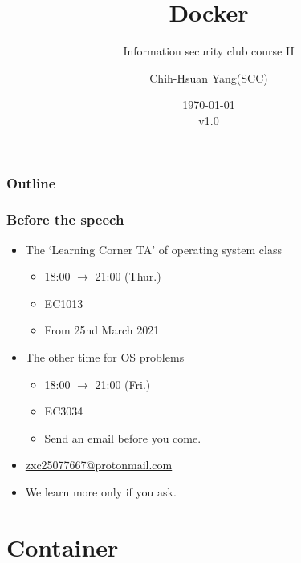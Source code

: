 \documentclass{beamer}
\title{Docker}
\subtitle{Information security club course \RN{2}}
\author{Chih-Hsuan Yang(SCC)}
\institute{National Sun Yat-sen University}
\date{\today\\v1.0}
\begin{document}
\begin{frame}
    \titlepage
\end{frame}

\begin{frame}
    \frametitle{Outline}
    \begin{multicols}{2}
        \tableofcontents
    \end{multicols}
\end{frame}

\begin{frame}
    \frametitle{Before the speech}
    \begin{itemize}
        \item The `Learning Corner TA' of operating system class
              \begin{itemize}
                  \item 18:00 $\to$ 21:00 (Thur.)
                  \item EC1013
                  \item From 25nd March 2021
              \end{itemize}
        \item The other time for OS problems
              \begin{itemize}
                  \item 18:00 $\to$ 21:00 (Fri.)
                  \item EC3034
                  \item Send an email before you come.
              \end{itemize}
        \item {\color{blue}\href{mailto::zxc25077667@protonmail.com}{zxc25077667@protonmail.com}}
        \item We learn more only if you ask.
    \end{itemize}
\end{frame}

\section{Container}
\end{document}
